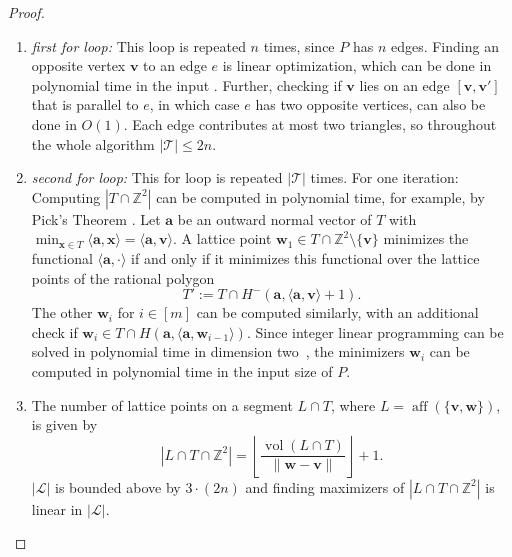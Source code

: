 \documentclass[11pt]{article}
\newcommand{\ba}{\mathbf{a}}
\newcommand{\bv}{\mathbf{v}}
\newcommand{\bw}{\mathbf{w}}
\newcommand{\bx}{\mathbf{x}}
\newcommand{\Z}{\mathbb{Z}}
\newcommand{\Tcal}{\mathcal{T}}
\DeclareMathOperator{\aff}{aff}
\begin{document}
\begin{proof}
    \begin{enumerate}
        \item \emph{first for loop:} This loop is repeated $n$ times, since $P$ has $n$ edges. Finding an opposite vertex $\bv$ to an edge $e$ is linear optimization, which can be done in polynomial time in the input \cite{LP_Poly}. Further, checking if $\bv$ lies on an edge $[\bv,\bv']$ that is parallel to $e$, in which case $e$ has two opposite vertices, can also be done in $O(1)$. Each edge contributes at most two triangles, so throughout the whole algorithm $|\Tcal| \leq 2n$.
        \item \emph{second for loop:} This for loop is repeated $|\mathcal{T}|$ times. For one iteration:
        Computing $|T \cap \Z^2|$ can be computed in polynomial time, for example, by Pick's Theorem \cite{pick99}. Let $\ba$ be an outward normal vector of $T$ with $\min_{\bx \in T} \langle \ba, \bx \rangle = \langle \ba,\bv \rangle$.
        A lattice point $\bw_1 \in T \cap \mathbb{Z}^2 \setminus \{\bv\}$ minimizes the functional $\langle \ba, \cdot \rangle$ if and only if it minimizes this functional over the lattice points of the rational polygon
        \[
        T' := T \cap H^-(\ba, \langle \ba, \bv \rangle + 1).
        \]
        The other $\bw_i$ for $i \in [m]$ can be computed similarly, with an additional check if $\bw_i \in T \cap H(\ba, \langle \ba, \bw_{i-1} \rangle)$. Since integer linear programming can be solved in polynomial time in dimension two~\cite{ILP-2d-poly}, the minimizers $\bw_i$ can be computed in polynomial time in the input size of $P$. 
        \item The number of lattice points on a segment $L \cap T$, where $L = \aff(\{\bv,\bw\})$, is given by
        \[
        |L \cap T \cap \mathbb{Z}^2| = \left\lfloor \frac{\operatorname{vol}(L \cap T)}{\|\bw - \bv\|} \right\rfloor + 1.
        \]
        $|\mathcal{L}|$ is bounded above by $3\cdot (2n)$
        and finding maximizers of $|L \cap T \cap \Z^2|$ is linear in $|\mathcal{L}|$.
    \end{enumerate}\vspace{-1.5em}
\end{proof}
\end{document}
